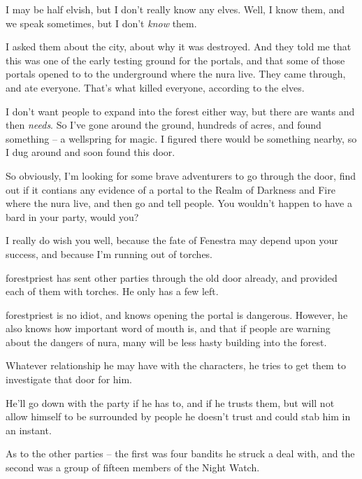 \begin{multicols}{2}
\begin{speechtext}
	I may be half elvish, but I don't really know any elves.  Well, I know them, and we speak sometimes, but I don't \emph{know} them.

	I asked them about the city, about why it was destroyed.
	And they told me that this was one of the early testing ground for the portals, and that some of those portals opened to to the underground where the nura live.
	They came through, and ate everyone.
	That's what killed everyone, according to the elves.

	I don't want people to expand into the forest either way, but there are wants and then \emph{needs}.  So I've gone around the ground, hundreds of acres, and found something -- a wellspring for magic.  I figured there would be something nearby, so I dug around and soon found this door.

	So obviously, I'm looking for some brave adventurers to go through the door, find out if it contians any evidence of a portal to the Realm of Darkness and Fire where the nura live, and then go and tell people.  You wouldn't happen to have a bard in your party, would you?

	I really do wish you well, because the fate of Fenestra may depend upon your success, and because I'm running out of torches.

\end{speechtext}

\Gls{forestpriest} has sent other parties through the old door already, and provided each of them with torches.
He only has a few left.

\Gls{forestpriest} is no idiot, and knows opening the portal is dangerous.
However, he also knows how important word of mouth is, and that if people are warning about the dangers of nura, many will be less hasty building into the forest.

Whatever relationship he may have with the characters, he tries to get them to investigate that door for him.

He'll go down with the party if he has to, and if he trusts them, but will not allow himself to be surrounded by people he doesn't trust and could stab him in an instant.

As to the other parties -- the first was four bandits he struck a deal with, and the second was a group of fifteen members of the Night Watch.




\end{multicols}
